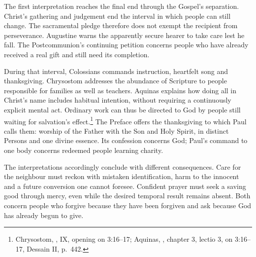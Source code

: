 The first interpretation reaches the final end through the Gospel's
separation. Christ's gathering and judgement end the interval in
which people can still change. The sacramental pledge therefore
does not exempt the recipient from perseverance. Augustine warns
the apparently secure hearer to take care lest he fall. The
Postcommunion's continuing petition concerns people who have
already received a real gift and still need its completion.

During that interval, Colossians commands instruction, heartfelt
song and thanksgiving. Chrysostom addresses the abundance of
Scripture to people responsible for families as well as teachers.
Aquinas explains how doing all in Christ's name includes habitual
intention, without requiring a continuously explicit mental act.
Ordinary work can thus be directed to God by people still waiting
for salvation's effect.\footnote{Chrysostom, , IX, opening on 3:16--17; Aquinas, , chapter 3, lectio 3, on 3:16--17, Dessain II, p.~442.}
The Preface offers the thanksgiving to which Paul calls them: worship
of the Father with the Son and Holy Spirit, in distinct Persons
and one divine essence. Its confession concerns God; Paul's
command to one body concerns redeemed people learning charity.

The interpretations accordingly conclude with different consequences.
Care for the neighbour must reckon with mistaken identification,
harm to the innocent and a future conversion one cannot foresee.
Confident prayer must seek a saving good through mercy, even while
the desired temporal result remains absent. Both concern people
who forgive because they have been forgiven and ask because God
has already begun to give.

